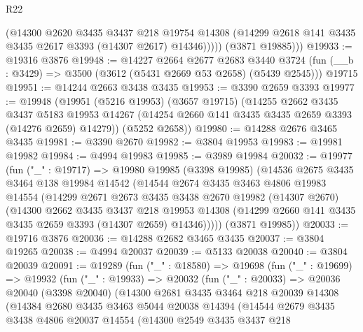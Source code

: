 \begin{lexlean}{R22}
\begin{coremodule}
              (@14300
                @2620
                @3435
                @3437
                @218
                @19754
                @14308
                (@14299 @2618 @141 @3435 @3435 @2617 @3393 (@14307 @2617) @14346)))))
        (@3871 @19885)))
@19933 := @19316 @3876
@19948 := @14227
    @2664
    @2677
    @2683
    @3440
    @3724
    (fun (__b : @3429) => @3500 (@3612 (@5431 @2669 @53 @2658) (@5439 @2545)))
    @19715
@19951 := @14244 @2663 @3438 @3435
@19953 := @3390 @2659 @3393
@19977 := @19948
    (@19951
      (@5216 @19953)
      (@3657 @19715)
      (@14255
        @2662
        @3435
        @3437
        @5183
        @19953
        @14267
        (@14254 @2660 @141 @3435 @3435 @2659 @3393 (@14276 @2659) @14279))
      (@5252 @2658))
@19980 := @14288 @2676 @3465 @3435
@19981 := @3390 @2670
@19982 := @3804 @19953
@19983 := @19981 @19982
@19984 := @4994 @19983
@19985 := @3989 @19984
@20032 := @19977
    (fun ("_" : @19717) =>
    @19980
      @19985
      (@3398 @19985)
      (@14536
        @2675
        @3435
        @3464
        @138
        @19984
        @14542
        (@14544
          @2674
          @3435
          @3463
          @4806
          @19983
          @14554
          (@14299
            @2671
            @2673
            @3435
            @3438
            @2670
            @19982
            (@14307 @2670)
            (@14300
              @2662
              @3435
              @3437
              @218
              @19953
              @14308
              (@14299 @2660 @141 @3435 @3435 @2659 @3393 (@14307 @2659) @14346)))))
      (@3871 @19985))
@20033 := @19716 @3876
@20036 := @14288 @2682 @3465 @3435
@20037 := @3804 @19265
@20038 := @4994 @20037
@20039 := @5133 @20038
@20040 := @3804 @20039
@20091 := @19289
    (fun ("_" : @18580) =>
    @19698
      (fun ("_" : @19699) =>
      @19932
        (fun ("_" : @19933) =>
        @20032
          (fun ("_" : @20033) =>
          @20036
            @20040
            (@3398 @20040)
            (@14300
              @2681
              @3435
              @3464
              @218
              @20039
              @14308
              (@14384
                @2680
                @3435
                @3463
                @5044
                @20038
                @14394
                (@14544
                  @2679
                  @3435
                  @3438
                  @4806
                  @20037
                  @14554
                  (@14300
                    @2549
                    @3435
                    @3437
                    @218

\end{coremodule}
\end{lexlean}
